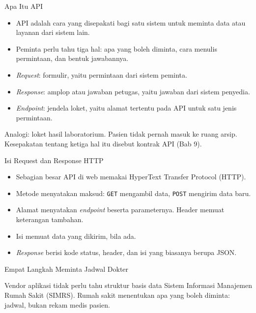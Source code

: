 \documentclass[aspectratio=169, table, 12pt]{beamer}
\begin{document}
\begin{frame}{{\Large Apa Itu API}}
  \begin{itemize}
    \item API adalah cara yang disepakati bagi satu sistem untuk meminta data atau layanan dari sistem lain.
    \item Peminta perlu tahu tiga hal: apa yang boleh diminta, cara menulis permintaan, dan bentuk jawabannya.
    \item \textit{Request}: formulir, yaitu permintaan dari sistem peminta.
    \item \textit{Response}: amplop atau jawaban petugas, yaitu jawaban dari sistem penyedia.
    \item \textit{Endpoint}: jendela loket, yaitu alamat tertentu pada API untuk satu jenis permintaan.
  \end{itemize}
  \vspace{2pt}
  {\footnotesize Analogi: loket hasil laboratorium. Pasien tidak pernah masuk ke ruang arsip. Kesepakatan tentang ketiga hal itu disebut kontrak API (Bab 9).\par}
\end{frame}

\begin{frame}{{\Large Isi Request dan Response HTTP}}
  \vspace{10pt}
  \begin{itemize}
    \item Sebagian besar API di web memakai HyperText Transfer Protocol (HTTP).
    \item Metode menyatakan maksud: \texttt{GET} mengambil data, \texttt{POST} mengirim data baru.
    \item Alamat menyatakan \textit{endpoint} beserta parameternya. Header memuat keterangan tambahan.
    \item Isi memuat data yang dikirim, bila ada.
    \item \textit{Response} berisi kode status, header, dan isi yang biasanya berupa JSON.
  \end{itemize}
\end{frame}

\begin{frame}{{\Large Empat Langkah Meminta Jadwal Dokter}}
  \centering
  \resizebox{!}{0.64\textheight}{}

  \vspace{2pt}
  {\footnotesize Vendor aplikasi tidak perlu tahu struktur basis data Sistem Informasi Manajemen Rumah Sakit (SIMRS). Rumah sakit menentukan apa yang boleh diminta: jadwal, bukan rekam medis pasien.\par}
\end{frame}
\end{document}
